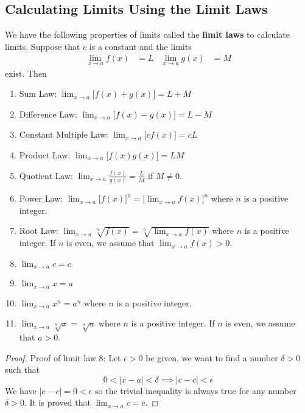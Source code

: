 \subsection{Calculating Limits Using the Limit Laws}

We have the following properties of limits called the \textbf{limit laws} to
calculate limits.
Suppose that \(c\) is a constant and the limits
\begin{align*}
    \lim_{x\to a}f(x) &= L & \lim_{x\to a}g(x) &= M
\end{align*}
exist.
Then
\begin{enumerate}
    \item Sum Law: \(\displaystyle{\lim_{x\to a}\big[f(x)+g(x)\big]=L+M}\)
    \item Difference Law: \(\displaystyle{\lim_{x\to a}\big[f(x)-g(x)\big]=L-M}\)
    \item Constant Multiple Law: \(\displaystyle{\lim_{x\to a}\big[cf(x)\big]=cL}\)
    \item Product Law: \(\displaystyle{\lim_{x\to a}\big[f(x)g(x)\big]=LM}\)
    \item Quotient Law:
    \(\displaystyle{\lim_{x\to a}\frac{f(x)}{g(x)}=\frac{L}{M}}\) if
    \(M\neq 0\).
    \item Power Law: \(\displaystyle{\lim_{x\to a}\big[f(x)\big]^n
    =\Big[\lim_{x\to a}f(x)\Big]^n}\) where \(n\) is a positive integer.
    \item Root Law: \(\displaystyle{\lim_{x\to a}\sqrt[n]{f(x)}
    =\sqrt[n]{\lim_{x\to a}f(x)}}\) where \(n\) is a positive integer.
    If \(n\) is even,
    we assume that \(\displaystyle{\lim_{x\to a}f(x)>0}\).
    \item \(\displaystyle{\lim_{x\to a}c=c}\)
    \item \(\displaystyle{\lim_{x\to a}x=a}\)
    \item \(\displaystyle{\lim_{x\to a}x^n=a^n}\) where \(n\) is a positive
    integer.
    \item \(\displaystyle{\lim_{x\to a}\sqrt[n]{x}=\sqrt[n]{a}}\) where \(n\)
    is a positive integer.
    If \(n\) is even,
    we assume that \(a>0\).
\end{enumerate}
\begin{proof}
    Proof of limit law 8:
    Let \(\epsilon>0\) be given,
    we want to find a number \(\delta>0\) such that
    \[0<|x-a|<\delta\implies|c-c|<\epsilon\]
    We have \(|c-c|=0<\epsilon\) so the trivial inequality is always true for
    any number \(\delta>0\).
    It is proved that \(\displaystyle{\lim_{x\to a}c=c}\).
\end{proof}
